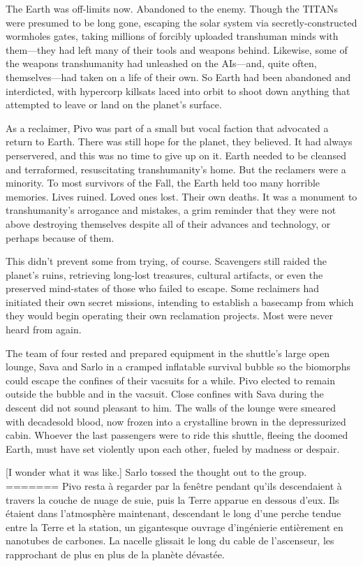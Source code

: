 The Earth was off-limits now. Abandoned to the enemy. Though the TITANs were presumed to be long gone, escaping the solar system via secretly-constructed wormholes gates, taking millions of forcibly uploaded transhuman minds with them—they had left many of their tools and weapons behind. Likewise, some of the weapons transhumanity had unleashed on the AIs—and, quite often, themselves—had taken on a life of their own. So Earth had been abandoned and interdicted, with hypercorp killsats laced into orbit to shoot down anything that attempted to leave or land on the planet's surface. 

As a reclaimer, Pivo was part of a small but vocal faction that advocated a return to Earth. There was still hope for the planet, they believed. It had always perservered, and this was no time to give up on it. Earth needed to be cleansed and terraformed, resuscitating transhumanity's home. But the reclamers were a minority. To most survivors of the Fall, the Earth held too many horrible memories. Lives ruined. Loved ones lost. Their own deaths. It was a monument to transhumanity's arrogance and mistakes, a grim reminder that they were not above destroying themselves despite all of their advances and technology, or perhaps because of them. 

This didn't prevent some from trying, of course. Scavengers still raided the planet's ruins, retrieving long-lost treasures, cultural artifacts, or even the preserved mind-states of those who failed to escape. Some reclaimers had initiated their own secret missions, intending to establish a basecamp from which they would begin operating their own reclamation projects. Most were never heard from again. 

The team of four rested and prepared equipment in the shuttle's large open lounge, Sava and Sarlo in a cramped inflatable survival bubble so the biomorphs could escape the confines of their vacsuits for a while. Pivo elected to remain outside the bubble and in the vacsuit. Close confines with Sava during the descent did not sound pleasant to him. The walls of the lounge were smeared with decadesold blood, now frozen into a crystalline brown in the depressurized cabin. Whoever the last passengers were to ride this shuttle, fleeing the doomed Earth, must have set violently upon each other, fueled by madness or despair. 

[I wonder what it was like.] Sarlo tossed the thought out to the group. 
=======
Pivo resta à regarder par la fenêtre pendant qu'ils descendaient à travers la couche de nuage de suie, puis la Terre apparue en dessous d'eux. Ils étaient dans l'atmosphère maintenant, descendant le long d'une perche tendue entre la Terre et la station, un gigantesque ouvrage d'ingénierie entièrement en nanotubes de carbones. La nacelle glissait le long du cable de l'ascenseur, les rapprochant de plus en plus de la planète dévastée. 

